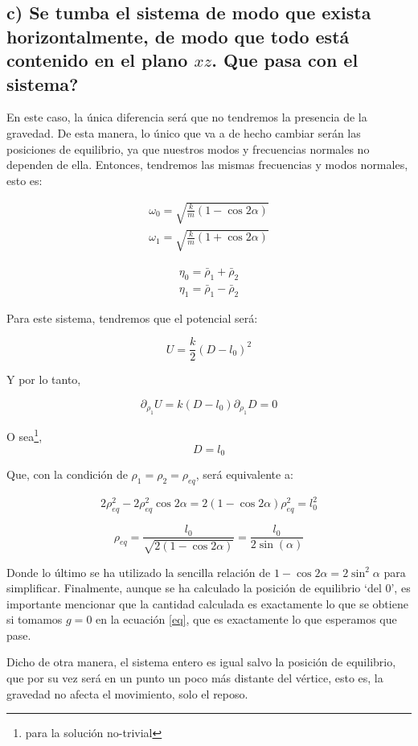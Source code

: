 \documentclass[a4paper,12pt]{article}
\begin{document}
\subsection*{c) Se tumba el sistema de modo que exista horizontalmente, de modo que todo está contenido en el plano $xz$. Que pasa con el sistema?}

En este caso, la única diferencia será que no tendremos la presencia de la gravedad. De esta manera, lo único que va a de hecho cambiar serán las posiciones de equilibrio, ya que nuestros modos y frecuencias normales no dependen de ella. Entonces, tendremos las mismas frecuencias y modos normales, esto es:

\begin{equation}
  \begin{aligned}
  \omega_0 = \sqrt{ \frac{k}{m} (1 - \cos{2\alpha})}\\
  \omega_1 = \sqrt{ \frac{k}{m} (1 + \cos{2\alpha})}
  \end{aligned}
\end{equation}

\begin{equation}
  \begin{aligned}
  \eta_0 = \bar{\rho}_1 + \bar{\rho}_2\\
  \eta_1 = \bar{\rho}_1 - \bar{\rho}_2
  \end{aligned}
\end{equation}


Para este sistema, tendremos que el potencial será:

$$U = \frac{k}{2} (D-l_0)^{2}$$

Y por lo tanto,

$$\partial_{\rho_{1}}U = k(D-l_0)\partial_{\rho_{1}}D = 0 $$

O sea\footnote{para la solución no-trivial},
$$D = l_{0}$$

Que, con la condición de $\rho_1= \rho_2 = \rho_{eq}$, será equivalente a:

$$2\rho_{eq}^2 - 2\rho_{eq}^2 \cos{2\alpha} = 2(1-\cos{2\alpha}) \rho_{eq}^2 = l_0^2$$

\begin{equation}
\rho_{eq} = \frac{l_0}{\sqrt{2(1-\cos{2\alpha})}} = \frac{l_0}{2\sin(\alpha)}
\end{equation}

Donde lo último se ha utilizado la sencilla relación de $1-\cos{2\alpha} = 2\sin^2{\alpha}$ para simplificar. Finalmente, aunque se ha calculado la posición de equilibrio `del 0', es importante mencionar que la cantidad calculada es exactamente lo que se obtiene si tomamos $g=0$ en la ecuación \eqref{eq}, que es exactamente lo que esperamos que pase. 

Dicho de otra manera, el sistema entero es igual salvo la posición de equilibrio, que por su vez será en un punto un poco más distante del vértice, esto es, la gravedad no afecta el movimiento, solo el reposo.
 
\end{document}
